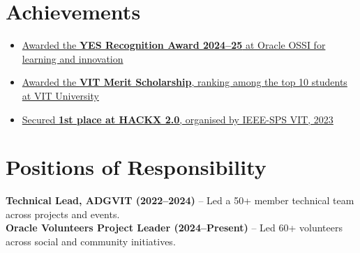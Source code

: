 \documentclass[letterpaper,11pt]{article}
\newcommand{\resumeItem}[1]{
  \item\small{{#1 \vspace{-1pt}}}
}
\newcommand{\resumeSubHeadingListStart}{\begin{itemize}[leftmargin=0.0in, label={}]}
\newcommand{\resumeSubHeadingListEnd}{\end{itemize}}
\newcommand{\resumeItemListStart}{\begin{itemize}}
\newcommand{\resumeItemListEnd}{\end{itemize}\vspace{-9pt}}
\begin{document}
\section{Achievements}
    \vspace{-3pt}
    \resumeSubHeadingListStart
      \resumeItemListStart
        \resumeItem{\href{https://drive.google.com/file/d/1RReZu2Fm9lYCAsLuDVKpCv4ea1fEU9DL/view?usp=sharing}
          {Awarded the \textbf{YES Recognition Award 2024--25} at Oracle OSSI for learning and innovation}}
        \resumeItem{\href{https://drive.google.com/file/d/1ncpbEwM8u1lUfpr4qJDBAfHfAED9nSfx/view?usp=sharing}
          {Awarded the \textbf{VIT Merit Scholarship}, ranking among the top 10 students at VIT University}}
        \resumeItem{\href{https://drive.google.com/file/d/1242fGIAlae87CG_29Kyui4Z8RPgcNqjJ/view?usp=drive_link}
          {Secured \textbf{1st place at HACKX 2.0}, organised by IEEE-SPS VIT, 2023}}
      \resumeItemListEnd
    \resumeSubHeadingListEnd
\vspace{-13pt}


\section{Positions of Responsibility}
\vspace{-4pt}
\small{
\textbf{Technical Lead, ADGVIT (2022--2024)} -- Led a 50+ member technical team across projects and events. \\
\textbf{Oracle Volunteers Project Leader (2024--Present)} -- Led 60+ volunteers across social and community initiatives.
}
\end{document}
